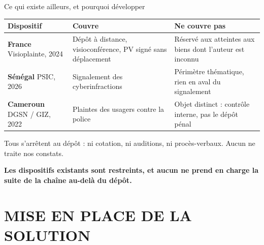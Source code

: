 \documentclass[9pt]{beamer}
\newcommand{\aretenir}[1]{%
  \vspace{2pt}%
  \begin{center}\small\color{vertPlainte}\textbf{#1}\end{center}}
\begin{document}
\begin{frame}{Ce qui existe ailleurs, et pourquoi développer}
\small
\begin{tabularx}{\textwidth}{@{}l>{\raggedright\arraybackslash}X>{\raggedright\arraybackslash}X@{}}
  \toprule
  \textbf{Dispositif} & \textbf{Couvre} & \textbf{Ne couvre pas} \\
  \midrule
  \textbf{France} \newline Visioplainte, 2024
    & Dépôt à distance, visioconférence, PV signé sans déplacement
    & Réservé aux atteintes aux biens dont l'auteur est inconnu \\
  \addlinespace
  \textbf{Sénégal} \newline PSIC, 2026
    & Signalement des cyberinfractions
    & Périmètre thématique, rien en aval du signalement \\
  \addlinespace
  \textbf{Cameroun} \newline DGSN / GIZ, 2022
    & Plaintes des usagers contre la police
    & Objet distinct : contrôle interne, pas le dépôt pénal \\
  \bottomrule
\end{tabularx}
\vspace{4pt}
\small Tous s'arrêtent au dépôt : ni cotation, ni auditions, ni procès-verbaux. Aucun ne traite nos constats.
\aretenir{Les dispositifs existants sont restreints, et aucun ne prend en charge la suite de la chaîne au-delà du dépôt.}
\end{frame}


\section{MISE EN PLACE DE LA SOLUTION}
\end{document}
